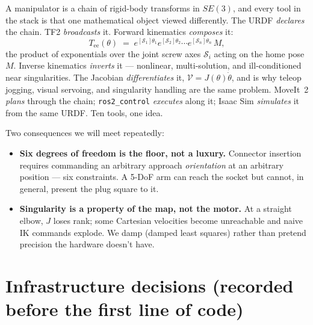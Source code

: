 A manipulator is a chain of rigid-body transforms in $SE(3)$, and every tool in the stack is
that one mathematical object viewed differently. The URDF \emph{declares} the chain. TF2
\emph{broadcasts} it. Forward kinematics \emph{composes} it:
\[
  T_{\text{ee}}(\theta) \;=\; e^{[\mathcal{S}_1]\theta_1} e^{[\mathcal{S}_2]\theta_2} \cdots
  e^{[\mathcal{S}_n]\theta_n}\, M ,
\]
the product of exponentials over the joint screw axes $\mathcal{S}_i$ acting on the home pose
$M$. Inverse kinematics \emph{inverts} it --- nonlinear, multi-solution, and ill-conditioned
near singularities. The Jacobian \emph{differentiates} it, $\mathcal{V} = J(\theta)\dot\theta$,
and is why teleop jogging, visual servoing, and singularity handling are the same problem.
MoveIt~2 \emph{plans} through the chain; \texttt{ros2\_control} \emph{executes} along it; Isaac
Sim \emph{simulates} it from the same URDF. Ten tools, one idea.

Two consequences we will meet repeatedly:
\begin{itemize}
  \item \textbf{Six degrees of freedom is the floor, not a luxury.} Connector insertion
  requires commanding an arbitrary approach \emph{orientation} at an arbitrary position ---
   six constraints. A 5-DoF arm can reach the socket but cannot, in general, present the plug
  square to it.
  \item \textbf{Singularity is a property of the map, not the motor.} At a straight elbow,
  $J$ loses rank; some Cartesian velocities become unreachable and naive IK commands explode.
  We damp (damped least squares) rather than pretend precision the hardware doesn't have.
\end{itemize}

\section{Infrastructure decisions (recorded before the first line of code)}
\label{sec:infra}

